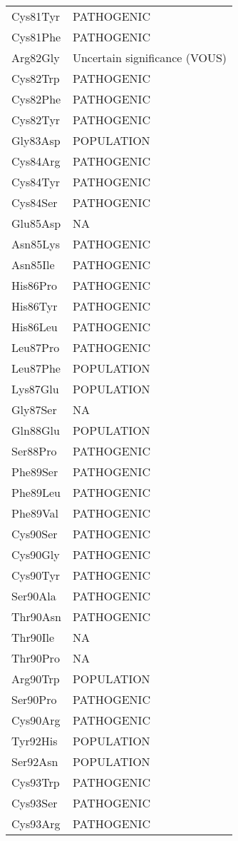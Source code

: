 \begin{tiny}
\begin{longtable}[l]{l|l}
	Cys81Tyr & PATHOGENIC \\
	Cys81Phe & PATHOGENIC \\
	Arg82Gly & Uncertain significance (VOUS) \\
	Cys82Trp & PATHOGENIC \\
	Cys82Phe & PATHOGENIC \\
	Cys82Tyr & PATHOGENIC \\
	Gly83Asp & POPULATION \\
	Cys84Arg & PATHOGENIC \\
	Cys84Tyr & PATHOGENIC \\
	Cys84Ser & PATHOGENIC \\
	Glu85Asp & NA \\
	Asn85Lys & PATHOGENIC \\
	Asn85Ile & PATHOGENIC \\
	His86Pro & PATHOGENIC \\
	His86Tyr & PATHOGENIC \\
	His86Leu & PATHOGENIC \\
	Leu87Pro & PATHOGENIC \\
	Leu87Phe & POPULATION \\
	Lys87Glu & POPULATION \\
	Gly87Ser & NA \\
	Gln88Glu & POPULATION \\
	Ser88Pro & PATHOGENIC \\
	Phe89Ser & PATHOGENIC \\
	Phe89Leu & PATHOGENIC \\
	Phe89Val & PATHOGENIC \\
	Cys90Ser & PATHOGENIC \\
	Cys90Gly & PATHOGENIC \\
	Cys90Tyr & PATHOGENIC \\
	Ser90Ala & PATHOGENIC \\
	Thr90Asn & PATHOGENIC \\
	Thr90Ile & NA \\
	Thr90Pro & NA \\
	Arg90Trp & POPULATION \\
	Ser90Pro & PATHOGENIC \\
	Cys90Arg & PATHOGENIC \\
	Tyr92His & POPULATION \\
	Ser92Asn & POPULATION \\
	Cys93Trp & PATHOGENIC \\
	Cys93Ser & PATHOGENIC \\
	Cys93Arg & PATHOGENIC \\

\end{longtable}
\end{tiny}
